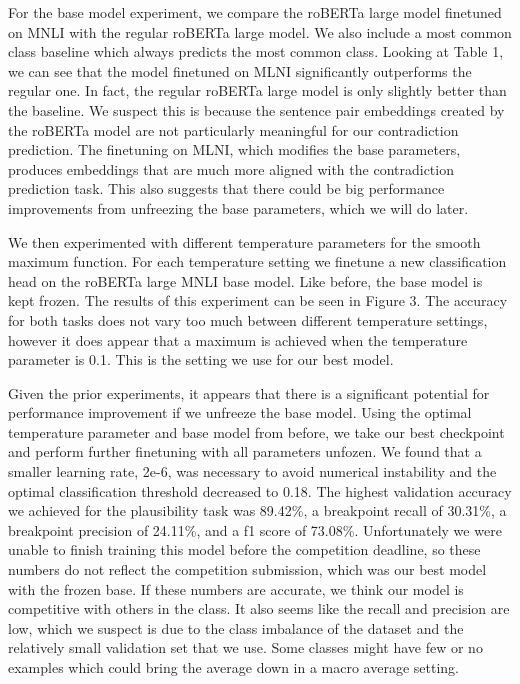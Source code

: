 \documentclass[11pt,a4paper]{article}
\begin{document}
For the base model experiment, we compare the roBERTa large model finetuned on MNLI with the regular roBERTa large model. We also include a most common class baseline which always predicts the most common class. Looking at Table 1, we can see that the model finetuned on MLNI significantly outperforms the regular one. In fact, the regular roBERTa large model is only slightly better than the baseline. We suspect this is because the sentence pair embeddings created by the roBERTa model are not particularly meaningful for our contradiction prediction. The finetuning on MLNI, which modifies the base parameters, produces embeddings that are much more aligned with the contradiction prediction task. This also suggests that there could be big performance improvements from unfreezing the base parameters, which we will do later.

We then experimented with different temperature parameters for the smooth maximum function. For each temperature setting we finetune a new classification head on the roBERTa large MNLI base model. Like before, the base model is kept frozen. The results of this experiment can be seen in Figure 3. The accuracy for both tasks does not vary too much between different temperature settings, however it does appear that a maximum is achieved when the temperature parameter is 0.1. This is the setting we use for our best model.

Given the prior experiments, it appears that there is a significant potential for performance improvement if we unfreeze the base model. Using the optimal temperature parameter and base model from before, we take our best checkpoint and perform further finetuning with all parameters unfozen. We found that a smaller learning rate, 2e-6, was necessary to avoid numerical instability and the optimal classification threshold decreased to 0.18. The highest validation accuracy we achieved for the plausibility task was 89.42\%, a breakpoint recall of 30.31\%, a breakpoint precision of 24.11\%, and a f1 score of 73.08\%. Unfortunately we were unable to finish training this model before the competition deadline, so these numbers do not reflect the competition submission, which was our best model with the frozen base. If these numbers are accurate, we think our model is competitive with others in the class. It also seems like the recall and precision are low, which we suspect is due to the class imbalance of the dataset and the relatively small validation set that we use. Some classes might have few or no examples which could bring the average down in a macro average setting.
\end{document}
